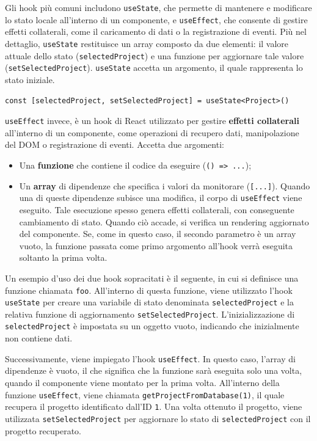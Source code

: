 \documentclass[target=bach,aauheader=,style=]{thud}
\begin{document}
\noindent Gli hook più comuni includono \texttt{useState}, che permette di mantenere e modificare lo stato locale all'interno di un componente, e \texttt{useEffect}, che consente di gestire effetti collaterali, come il caricamento di dati o la registrazione di eventi. Più nel dettaglio, \texttt{useState} restituisce un array composto da due elementi: il valore attuale dello stato (\texttt{selectedProject}) e una funzione per aggiornare tale valore (\texttt{setSelectedProject}). \texttt{useState} accetta un argomento, il quale rappresenta lo stato iniziale.

\begin{center}
\texttt{const [selectedProject, setSelectedProject] = useState<Project>({})}
\end{center}

\noindent \texttt{useEffect} invece, è un hook di React utilizzato per gestire \textbf{effetti collaterali} all'interno di un componente, come operazioni di recupero dati, manipolazione del DOM o registrazione di eventi. Accetta due argomenti: 

\begin{itemize}
    \item Una \textbf{funzione} che contiene il codice da eseguire (\texttt{() => {...}});
    \item Un \textbf{array} di dipendenze che specifica i valori da monitorare (\texttt{[...]}). Quando una di queste dipendenze subisce una modifica, il corpo di \texttt{useEffect} viene eseguito. Tale esecuzione spesso genera effetti collaterali, con conseguente cambiamento di stato. Quando ciò accade, si verifica un rendering aggiornato del componente. Se, come in questo caso, il secondo parametro è un array vuoto, la funzione passata come primo argomento all'hook verrà eseguita soltanto la prima volta.
\end{itemize}

\noindent Un esempio d'uso dei due hook sopracitati è il seguente, in cui si definisce una funzione chiamata \texttt{foo}. All'interno di questa funzione, viene utilizzato l'hook \texttt{useState} per creare una variabile di stato denominata \texttt{selectedProject} e la relativa funzione di aggiornamento \texttt{setSelectedProject}. L'inizializzazione di \texttt{selectedProject} è impostata su un oggetto vuoto, indicando che inizialmente non contiene dati.

\noindent Successivamente, viene impiegato l'hook \texttt{useEffect}. In questo caso, l'array di dipendenze è vuoto, il che significa che la funzione sarà eseguita solo una volta, quando il componente viene montato per la prima volta. All'interno della funzione \texttt{useEffect}, viene chiamata \texttt{getProjectFromDatabase(1)}, il quale recupera il progetto identificato dall'ID \texttt{1}. Una volta ottenuto il progetto, viene utilizzata \texttt{setSelectedProject} per aggiornare lo stato di \texttt{selectedProject} con il progetto recuperato.
\end{document}
